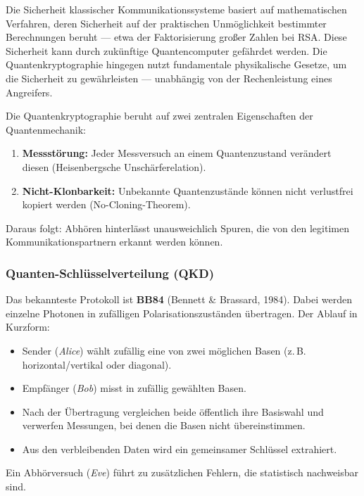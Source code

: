 Die Sicherheit klassischer Kommunikationssysteme basiert auf mathematischen Verfahren, deren Sicherheit auf der praktischen Unmöglichkeit bestimmter Berechnungen beruht — etwa der Faktorisierung großer Zahlen bei RSA. Diese Sicherheit kann durch zukünftige Quantencomputer gefährdet werden.  
Die Quantenkryptographie hingegen nutzt fundamentale physikalische Gesetze, um die Sicherheit zu gewährleisten — unabhängig von der Rechenleistung eines Angreifers.
\vspace{1em}
\begin{tcolorbox}[physikbox, title=Kernprinzip der Quantenkryptographie \label{box:qcrypto_prinzip}]
	\small
	Die Quantenkryptographie beruht auf zwei zentralen Eigenschaften der Quantenmechanik:
	\begin{enumerate}
		\item \textbf{Messstörung:} Jeder Messversuch an einem Quantenzustand verändert diesen (Heisenbergsche Unschärferelation).
		\item \textbf{Nicht-Klonbarkeit:} Unbekannte Quantenzustände können nicht verlustfrei kopiert werden (No-Cloning-Theorem).
	\end{enumerate}
	Daraus folgt: Abhören hinterlässt unausweichlich Spuren, die von den legitimen Kommunikationspartnern erkannt werden können.
\end{tcolorbox}
\newpage
\noindent
\subsubsection{Quanten-Schlüsselverteilung (QKD)}

Das bekannteste Protokoll ist \textbf{BB84} (Bennett \& Brassard, 1984). Dabei werden einzelne Photonen in zufälligen Polarisationszuständen übertragen.  
Der Ablauf in Kurzform:
\begin{itemize}
	\item Sender (\emph{Alice}) wählt zufällig eine von zwei möglichen Basen (z.\,B. horizontal/vertikal oder diagonal).
	\item Empfänger (\emph{Bob}) misst in zufällig gewählten Basen.
	\item Nach der Übertragung vergleichen beide öffentlich ihre Basiswahl und verwerfen Messungen, bei denen die Basen nicht übereinstimmen.
	\item Aus den verbleibenden Daten wird ein gemeinsamer Schlüssel extrahiert.
\end{itemize}
Ein Abhörversuch (\emph{Eve}) führt zu zusätzlichen Fehlern, die statistisch nachweisbar sind.

